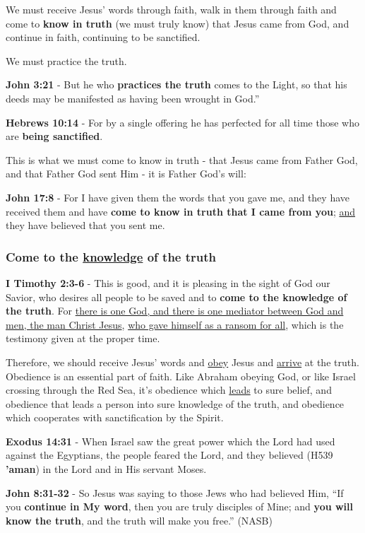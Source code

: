 \documentclass[11pt]{article}
\begin{document}
We must receive Jesus' words through faith, walk in them through faith and come to \textbf{know in truth} (we must truly know) that Jesus came from God, and continue in faith, continuing to be sanctified.

We must practice the truth.

\textbf{John 3:21} - But he who \textbf{practices the truth} comes to the Light, so that his deeds may be manifested as having been wrought in God.”

\textbf{Hebrews 10:14} - For by a single offering he has perfected for all time those who are \textbf{being sanctified}.

This is what we must come to know in truth - that Jesus came from Father God, and that Father God sent Him - it is Father God's will:

\textbf{John 17:8} - For I have given them the words that you gave me, and they have received them and have \textbf{come to know in truth that I came from you}; \uline{and} they have believed that you sent me.

\subsubsection{Come to the \underline{knowledge} of the truth}
\label{sec:orge7b77a0}

\textbf{I Timothy 2:3-6} - This is good, and it is pleasing in the sight of God our Savior, who desires all people to be saved and to \textbf{come to the knowledge of the truth}. For \uline{there is one God, and there is one mediator between God and men, the man Christ Jesus}, \uline{who gave himself as a ransom for all}, which is the testimony given at the proper time.

Therefore, we should receive Jesus' words and \uline{obey} Jesus and \uline{arrive} at the truth. Obedience is an essential part of faith. Like Abraham obeying God, or like Israel crossing through the Red Sea, it's obedience which \uline{leads} to sure belief, and obedience that leads a person into sure knowledge of the truth, and obedience which cooperates with sanctification by the Spirit.

\textbf{Exodus 14:31} - When Israel saw the great power which the Lord had used against the Egyptians, the people feared the Lord, and they believed (H539 \textbf{'aman}) in the Lord and in His servant Moses.

\textbf{John 8:31-32} - So Jesus was saying to those Jews who had believed Him, “If you \textbf{continue in My word}, then you are truly disciples of Mine; and \textbf{you will know the truth}, and the truth will make you free.” (NASB)
\end{document}
